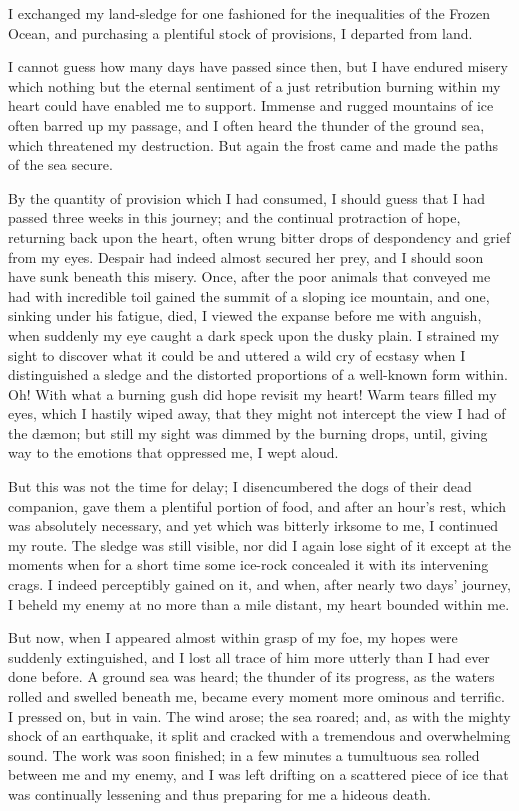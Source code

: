 \documentclass[12pt,openright]{book}
\begin{document}
I exchanged my land-sledge for one fashioned for the inequalities of the Frozen Ocean, and purchasing a plentiful stock of provisions, I departed from land.

I cannot guess how many days have passed since then, but I have endured misery which nothing but the eternal sentiment of a just retribution burning within my heart could have enabled me to support. Immense and rugged mountains of ice often barred up my passage, and I often heard the thunder of the ground sea, which threatened my destruction. But again the frost came and made the paths of the sea secure.

By the quantity of provision which I had consumed, I should guess that I had passed three weeks in this journey; and the continual protraction of hope, returning back upon the heart, often wrung bitter drops of despondency and grief from my eyes. Despair had indeed almost secured her prey, and I should soon have sunk beneath this misery. Once, after the poor animals that conveyed me had with incredible toil gained the summit of a sloping ice mountain, and one, sinking under his fatigue, died, I viewed the expanse before me with anguish, when suddenly my eye caught a dark speck upon the dusky plain. I strained my sight to discover what it could be and uttered a wild cry of ecstasy when I distinguished a sledge and the distorted proportions of a well-known form within. Oh! With what a burning gush did hope revisit my heart! Warm tears filled my eyes, which I hastily wiped away, that they might not intercept the view I had of the dæmon; but still my sight was dimmed by the burning drops, until, giving way to the emotions that oppressed me, I wept aloud.

But this was not the time for delay; I disencumbered the dogs of their dead companion, gave them a plentiful portion of food, and after an hour’s rest, which was absolutely necessary, and yet which was bitterly irksome to me, I continued my route. The sledge was still visible, nor did I again lose sight of it except at the moments when for a short time some ice-rock concealed it with its intervening crags. I indeed perceptibly gained on it, and when, after nearly two days’ journey, I beheld my enemy at no more than a mile distant, my heart bounded within me.

But now, when I appeared almost within grasp of my foe, my hopes were suddenly extinguished, and I lost all trace of him more utterly than I had ever done before. A ground sea was heard; the thunder of its progress, as the waters rolled and swelled beneath me, became every moment more ominous and terrific. I pressed on, but in vain. The wind arose; the sea roared; and, as with the mighty shock of an earthquake, it split and cracked with a tremendous and overwhelming sound. The work was soon finished; in a few minutes a tumultuous sea rolled between me and my enemy, and I was left drifting on a scattered piece of ice that was continually lessening and thus preparing for me a hideous death.
\end{document}
